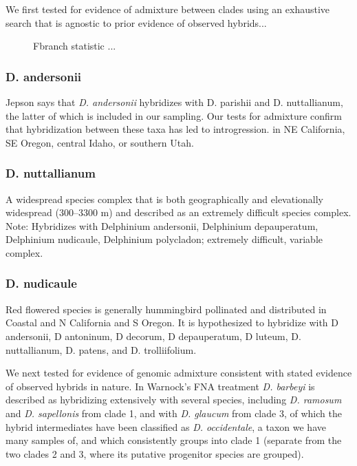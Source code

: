 \documentclass[11pt]{article}
\begin{document}
We first tested for evidence of admixture between clades using an exhaustive
search that is agnostic to prior evidence of observed hybrids...
% 


\begin{figure}[t]
	\centering
	\caption{
        Fbranch statistic ...
	}
	\label{fig:3}
\end{figure}



\subsubsection{D. andersonii}
Jepson says that \emph{D. andersonii} hybridizes with D. parishii and D. nuttallianum,
the latter of which is included in our sampling. Our tests for admixture confirm
that hybridization between these taxa has led to introgression.
in NE California, SE Oregon, central Idaho, or southern Utah. 


\subsubsection{D. nuttallianum}
A widespread species complex that is both geographically and elevationally widespread (300--3300 m) and 
described as an extremely difficult species complex. 
Note: Hybridizes with Delphinium andersonii, Delphinium depauperatum, Delphinium nudicaule, Delphinium polycladon; extremely difficult, variable complex.


\subsubsection{D. nudicaule}
Red flowered species is generally hummingbird pollinated and distributed in Coastal and N California and S Oregon. It is hypothesized to hybridize with D andersonii, D antoninum, D decorum, D depauperatum, D luteum, D. nuttallianum, D. patens, and D. trolliifolium. 



We next tested for evidence of genomic admixture consistent with stated evidence
of observed hybrids in nature. In Warnock's FNA treatment \emph{D. barbeyi} is 
described as hybridizing extensively with several species, including 
\emph{D. ramosum} and \emph{D. sapellonis} from clade 1, and with 
\emph{D. glaucum} from clade 3, of which the hybrid intermediates have been 
classified as \emph{D. occidentale}, a taxon we have many samples of, and
which consistently groups into clade 1 (separate from the two clades 2 and 3, 
where its putative progenitor species are grouped). 
\end{document}
